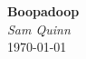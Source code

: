 \documentclass{article}
\begin{document}
\begin{center}
  \Large\textbf{Boopadoop}\\
  \large\textit{Sam Quinn}\\
  \today
\end{center}

\subsection{}


\end{document}
